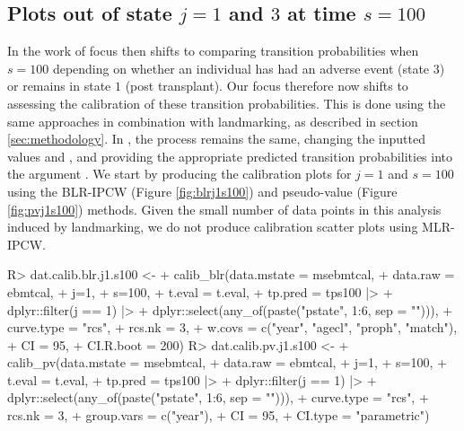 \documentclass[article,shortnames]{jss}
\begin{document}
\subsection[Plots out of state j = 1 and 3 at time s = 100]{Plots out of state $j = 1$ and $3$ at time $s = 100$} \label{sec:plotss100}

In the work of \cite{DeWreede2011} focus then shifts to comparing transition probabilities when $s = 100$ depending on whether an individual has had an adverse event (state $3$) or remains in state $1$ (post transplant). Our focus therefore now shifts to assessing the calibration of these transition probabilities. This is done using the same approaches in combination with landmarking, as described in section \ref{sec:methodology}. In , the process remains the same, changing the inputted values  and , and providing the appropriate predicted transition probabilities into the argument . We start by producing the calibration plots for $j = 1$ and $s = 100$ using the BLR-IPCW (Figure \ref{fig:blrj1s100}) and pseudo-value (Figure \ref{fig:pvj1s100}) methods. Given the small number of data points in this analysis induced by landmarking, we do not produce calibration scatter plots using MLR-IPCW.

\begin{Schunk}
\begin{Sinput}
R> dat.calib.blr.j1.s100 <-
+    calib_blr(data.mstate = msebmtcal,
+                   data.raw = ebmtcal,
+                   j=1,
+                   s=100,
+                   t.eval = t.eval,
+                   tp.pred = tps100 |>
+                     dplyr::filter(j == 1) |>
+                     dplyr::select(any_of(paste("pstate", 1:6, sep = ""))),
+                   curve.type = "rcs",
+                   rcs.nk = 3,
+                   w.covs = c("year", "agecl", "proph", "match"),
+                   CI = 95,
+                   CI.R.boot = 200)
R> dat.calib.pv.j1.s100 <-
+    calib_pv(data.mstate = msebmtcal,
+                  data.raw = ebmtcal,
+                  j=1,
+                  s=100,
+                  t.eval = t.eval,
+                  tp.pred = tps100 |>
+                   dplyr::filter(j == 1) |>
+                   dplyr::select(any_of(paste("pstate", 1:6, sep = ""))),
+                  curve.type = "rcs",
+                  rcs.nk = 3,
+                  group.vars = c("year"),
+                  CI = 95,
+                  CI.type = "parametric")
\end{Sinput}
\end{Schunk}
\end{document}
